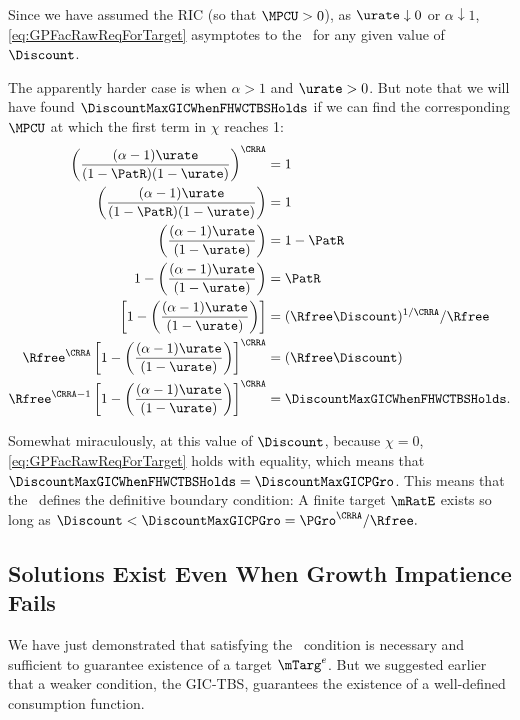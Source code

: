 \documentclass{\handout}
\begin{document}
Since we have assumed the RIC (so that $\MPCU > 0$), as $\urate \downarrow 0$ or $\alpha \downarrow 1$, \eqref{eq:GPFacRawReqForTarget} asymptotes to the \GICPGro~for any given value of $\Discount$.  

The apparently harder case is when $\alpha>1$ and $\urate > 0$.  But note that we will have found $\DiscountMaxGICWhenFHWCTBSHolds$ if we can find the corresponding $\MPCU$ at which the first term in $\chi$ reaches 1:
\begin{equation}\begin{gathered}\begin{aligned}
    \left(\frac{(\alpha-1)\urate}{(1-\PatR) (1-\urate)}\right)^{\CRRA} & =  1
\\  \left(\frac{(\alpha-1)\urate}{(1-\PatR) (1-\urate)}\right) & =  1
\\  \left(\frac{(\alpha-1)\urate}{ (1-\urate)}\right) & =  1-\PatR
\\  1-\left(\frac{(\alpha-1)\urate}{ (1-\urate)}\right) & =  \PatR
\\                  \left[1-\left(\frac{(\alpha-1)\urate}{ (1-\urate)}\right)\right] & =  (\Rfree \Discount)^{1/\CRRA}/\Rfree
\\  \Rfree^{\CRRA}  \left[1-\left(\frac{(\alpha-1)\urate}{ (1-\urate)}\right)\right]^{\CRRA} & =  (\Rfree \Discount)
\\  \Rfree^{\CRRA-1}\left[1-\left(\frac{(\alpha-1)\urate}{ (1-\urate)}\right)\right]^{\CRRA} & =  \DiscountMaxGICWhenFHWCTBSHolds \label{eq:DiscountMaxGICWhenFHWCTBSHoldsAndGICPGroIsExactlySatisfied}
.\end{aligned}\end{gathered}\end{equation}

Somewhat miraculously, at this value of $\Discount$, because $\chi=0$, \eqref{eq:GPFacRawReqForTarget} holds with equality, which means that $\DiscountMaxGICWhenFHWCTBSHolds=\DiscountMaxGICPGro$.  This means that the \GICPGro~defines the definitive boundary condition:  A finite target $\mRatE$ exists so long as $\Discount < \DiscountMaxGICPGro = \PGro^{\CRRA}/\Rfree.$

\subsection{Solutions Exist Even When Growth Impatience Fails}

We have just demonstrated that satisfying the \GICPGro~condition is necessary and sufficient to guarantee existence of a target $\mTarg^{e}$.  But we suggested earlier that a weaker condition, the GIC-TBS, guarantees the existence of a well-defined consumption function.
\end{document}
